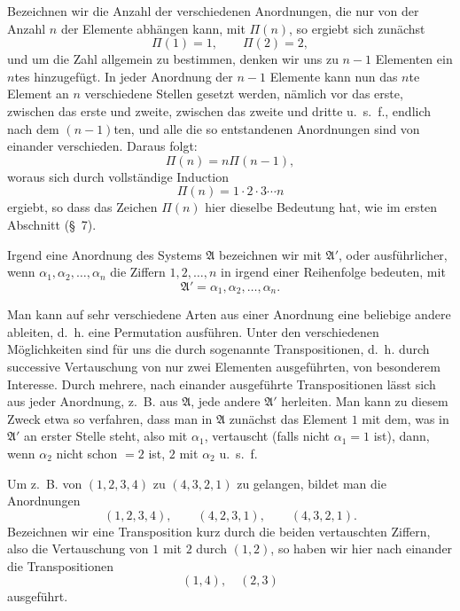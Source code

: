 \documentclass[11pt]{article}
\begin{document}
Bezeichnen wir die Anzahl der verschiedenen Anordnungen, die nur von der Anzahl \(n\) der Elemente abhängen kann, mit \(\Pi(n)\), so ergiebt sich zunächst
\[
\Pi(1)=1,\qquad \Pi(2)=2,
\]
und um die Zahl allgemein zu bestimmen, denken wir uns zu \(n-1\) Elementen ein \(n\)tes hinzugefügt. In jeder Anordnung der \(n-1\) Elemente kann nun das \(n\)te Element an \(n\) verschiedene Stellen gesetzt werden, nämlich vor das erste, zwischen das erste und zweite, zwischen das zweite und dritte u.~s.~f., endlich nach dem \((n-1)\)ten, und alle die so entstandenen Anordnungen sind von einander verschieden. Daraus folgt:
\begin{equation}
\Pi(n)=n\Pi(n-1),
\tag{1}
\end{equation}
woraus sich durch vollständige Induction
\begin{equation}
\Pi(n)=1\cdot2\cdot3\cdots n
\tag{2}
\end{equation}
ergiebt, so dass das Zeichen \(\Pi(n)\) hier dieselbe Bedeutung hat, wie im ersten Abschnitt (\S~7).

Irgend eine Anordnung des Systems \(\mathfrak A\) bezeichnen wir mit \(\mathfrak A'\), oder ausführlicher, wenn \(\alpha_1,\alpha_2,\ldots,\alpha_n\) die Ziffern \(1,2,\ldots,n\) in irgend einer Reihenfolge bedeuten, mit
\begin{equation}
\mathfrak A'=\alpha_1,\alpha_2,\ldots,\alpha_n.
\tag{3}
\end{equation}

Man kann auf sehr verschiedene Arten aus einer Anordnung eine beliebige andere ableiten, d.~h. eine Permutation ausführen. Unter den verschiedenen Möglichkeiten sind für uns die durch sogenannte Transpositionen, d.~h. durch successive Vertauschung von nur zwei Elementen ausgeführten, von besonderem Interesse. Durch mehrere, nach einander ausgeführte Transpositionen lässt sich aus jeder Anordnung, z.~B. aus \(\mathfrak A\), jede andere \(\mathfrak A'\) herleiten. Man kann zu diesem Zweck etwa so verfahren, dass man in \(\mathfrak A\) zunächst das Element \(1\) mit dem, was in \(\mathfrak A'\) an erster Stelle steht, also mit \(\alpha_1\), vertauscht (falls nicht \(\alpha_1=1\) ist), dann, wenn \(\alpha_2\) nicht schon \(=2\) ist, \(2\) mit \(\alpha_2\) u.~s.~f.

Um z.~B. von \((1,2,3,4)\) zu \((4,3,2,1)\) zu gelangen, bildet man die Anordnungen
\[
(1,2,3,4),\qquad (4,2,3,1),\qquad (4,3,2,1).
\]
Bezeichnen wir eine Transposition kurz durch die beiden vertauschten Ziffern, also die Vertauschung von \(1\) mit \(2\) durch \((1,2)\), so haben wir hier nach einander die Transpositionen
\[
(1,4),\quad (2,3)
\]
ausgeführt.
\end{document}
